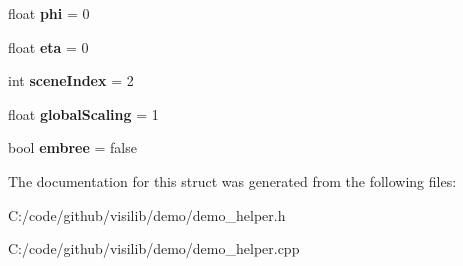 \begin{DoxyCompactItemize}
float {\bfseries phi} = 0
\item 
\mbox{\label{structvisilib_demo_1_1_demo_configuration_a2bcb888d4b09e25254adb550df9a40fa}} 
float {\bfseries eta} = 0
\item 
\mbox{\label{structvisilib_demo_1_1_demo_configuration_a76f15d93c415952a1f67ecfcfb3d077e}} 
int {\bfseries scene\+Index} = 2
\item 
\mbox{\label{structvisilib_demo_1_1_demo_configuration_a336102227ae9723d0d8a8d1940f4a398}} 
float {\bfseries global\+Scaling} = 1
\item 
\mbox{\label{structvisilib_demo_1_1_demo_configuration_a8184f41632e61de7afc55af8e5711d78}} 
bool {\bfseries embree} = false
\end{DoxyCompactItemize}


The documentation for this struct was generated from the following files\+:\begin{DoxyCompactItemize}
\item 
C\+:/code/github/visilib/demo/demo\+\_\+helper.\+h\item 
C\+:/code/github/visilib/demo/demo\+\_\+helper.\+cpp\end{DoxyCompactItemize}
